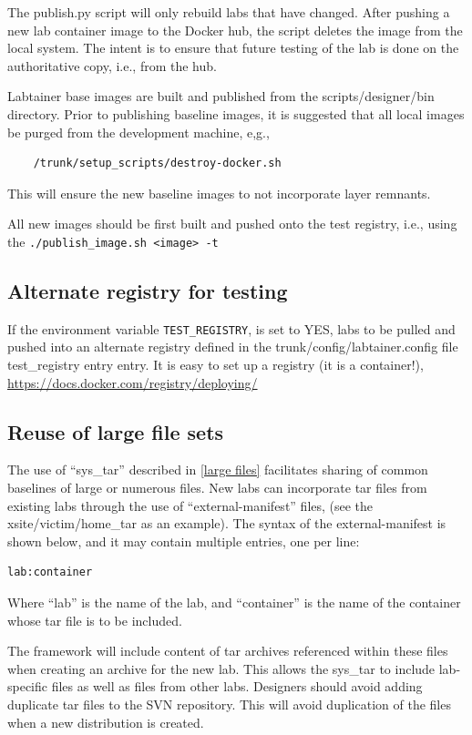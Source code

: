 \documentclass[12pt]{article}
\begin{document}
The publish.py script will only rebuild labs that have changed.  After pushing a new lab container
image to the Docker hub, the script deletes the image from the local system.  The intent is to
ensure that future testing of the lab is done on the authoritative copy, i.e., from the hub.

Labtainer base images are built and published from the scripts/designer/bin directory.  Prior to publishing
baseline images, it is suggested that all local images be purged from the development machine, e,g.,
\begin{verbatim}
    /trunk/setup_scripts/destroy-docker.sh
\end{verbatim}
\noindent This will ensure the new baseline images to not incorporate layer remnants.

All new images should be first built and pushed onto the test registry, i.e., using the 
{\tt ./publish\_image.sh <image> -t}

\subsection{Alternate registry for testing}
If the environment variable {\tt TEST\_REGISTRY}, is set to YES, labs to be pulled and pushed
into an alternate registry defined in the trunk/config/labtainer.config file test\_registry entry entry.
It is easy to set up a registry (it is a container!), \url{https://docs.docker.com/registry/deploying/}

\subsection{Reuse of large file sets}
\label{manifest}
The use of ``sys\_tar'' described in \ref{large files} facilitates sharing of common
baselines of large or numerous files.  New labs can incorporate tar files from existing
labs through the use of ``external-manifest'' files, (see the xsite/victim/home\_tar as
an example).   The syntax of the external-manifest is shown below, and it may contain
multiple entries, one per line:
\begin{verbatim}
lab:container
\end{verbatim}
\noindent Where ``lab'' is the name of the lab, and ``container'' is the name of the container
whose tar file is to be included.

The framework will include content of tar archives referenced within these files
when creating an archive for the new lab.  This allows the sys\_tar to include lab-specific files
as well as files from other labs.  Designers should avoid adding duplicate tar files to the SVN repository.
This will avoid duplication of the files when a new distribution is created.
\end{document}
